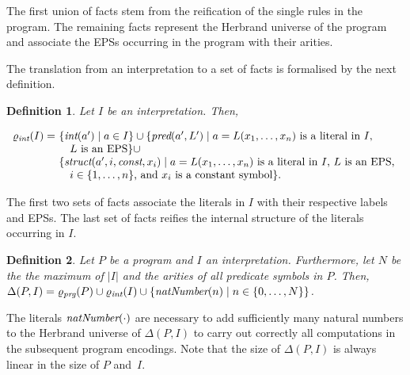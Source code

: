 \documentclass{tlp}
\newcommand{\reif}[1]{\Delta(#1)}
\newcommand{\constant}[1]{\ensuremath{\mathit{#1}}}
\newcommand{\INPUT}{\reif{P,I}}
\renewcommand{\mathit}[1]{{\text{\it{#1}}}}
\newtheorem{definition}{Definition}
\begin{document}
 The first union of facts stem from the reification of the single rules in the program.
The remaining facts  represent the Herbrand universe of the program and 
associate the EPSs occurring in the program with their
arities.

The translation from an interpretation to a set of facts is formalised by the next definition.
\begin{definition}
Let  $I$ be an interpretation. Then, 
\begin{center}
$\begin{array}{r@{}l}
\reifint{I} =\ & \{\mathit{int}(a') \mid  a \in I\}  \cup  
 \{\mathit{pred}(a',L') \mid \mbox{$a = L(x_{1}, \ldots, x_{n})$ is a literal in $I$,} \\
&\quad  \mbox{$L$ is an EPS}\}   \cup \\
&\{\mathit{struct}(a',i,\constant{const},x_{i}) \mid   \mbox{$a = L(x_{1},\ldots, x_{n})$ is a literal in $I$, $L$ is an EPS, }\\
&\quad \mbox{$i \in \{1, \ldots, n\}$, and $x_{i}$ is a constant symbol}  \}\mbox{.} 
\end{array}$
\end{center}
\end{definition}

The first two sets of facts associate the literals in  $I$ with their respective labels and 
EPSs.
The last set of facts reifies the internal structure of the literals occurring in $I$. 

\begin{definition}
Let $P$ be a program and $I$ an interpretation. 
Furthermore, let $N$ be the  the maximum of $|I|$ and the arities of all predicate symbols in $P$.
Then, $\INPUT = 
 \reifprg{P} \cup \reifint{I}  \cup 
\{ \mathit{natNumber}(n) \mid n \in \{0, \ldots, N\} \}$.

\end{definition}
The literals $\mathit{natNumber}(\cdot)$  are necessary  to add sufficiently many natural numbers to the Herbrand universe of $\INPUT$ to carry out correctly all computations in the subsequent program encodings. 
Note that the size of $\INPUT$  is always linear in the size
of $P$ and~$I$.
\end{document}
